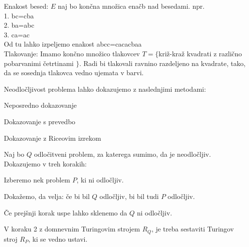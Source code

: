 \documentclass[10pt,a4paper,oneside]{book}
\begin{document}

Enakost besed: $E$ naj bo končna množica enačb nad besedami. npr. \\
1. bc=cba\\
2. ba=abc\\
3. ca=ac\\
Od tu lahko izpeljemo enakost abcc=cacacbaa\\%
\br
Tlakovanje: Imamo končno množico tlakovcev $T=\{$\fixme križ-kraž kvadrati z različno pobarvanimi četrtinami $\}$. Radi bi tlakovali ravnino razdeljeno na kvadrate, tako, da se sosednja tlakovca vedno ujemata v barvi.%
\\

Neodločljivost problema lahko dokazujemo z naslednjimi metodami:
\begin{items}
\item Neposredno dokazovanje %
\item Dokazovanje s prevedbo %
\item Dokazovanje z Riceovim izrekom %
\end{items}

Naj bo $Q$ odločitveni problem, za katerega sumimo, da je neodločljiv.%
Dokazujemo v treh korakih:
\begin{items}
\item Izberemo nek problem $P$, ki ni odločljiv. %
\item Dokažemo, da velja: če bi bil $Q$ odločljiv, bi bil tudi $P$ odločljiv.
\item Če prejšnji korak uspe lahko sklenemo da $Q$ ni odločljiv. %
\end{items}
V koraku 2 z domnevnim Turingovim strojem $R_Q$, je treba sestaviti Turingov stroj $R_P$, ki se vedno ustavi.
\end{document}
